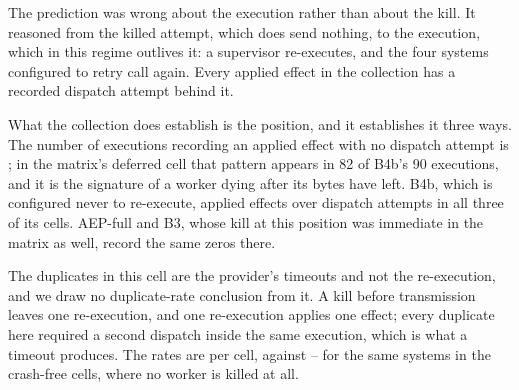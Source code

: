 The prediction was wrong about the execution rather than about the kill. It
reasoned from the killed attempt, which does send nothing, to the execution,
which in this regime outlives it: a supervisor re-executes, and the four
systems configured to retry call again. Every applied effect in the collection
has a recorded dispatch attempt behind it.

What the collection does establish is the position, and it establishes it
three ways. The number of executions recording an applied effect with no
dispatch attempt is \AbdZeroDispatchApplied{}; in the matrix's deferred cell
that pattern appears in 82 of B4b's 90 executions, and it is the signature of
a worker dying after its bytes have left. B4b, which is configured never to
re-execute, applied \AbdBfourbApplied{} effects over \AbdBfourbDispatch{}
dispatch attempts in all three of its cells. AEP-full and B3, whose kill at
this position was immediate in the matrix as well, record the same zeros
there.

The duplicates in this cell are the provider's timeouts and not the
re-execution, and we draw no duplicate-rate conclusion from it. A kill before
transmission leaves one re-execution, and one re-execution applies one effect;
every duplicate here required a second dispatch inside the same execution,
which is what a timeout produces. The rates are \AbdDupRange{} per cell,
against \CrashFreeDupLow{}--\CrashFreeDupHigh{} for the same systems in the
crash-free cells, where no worker is killed at all.
